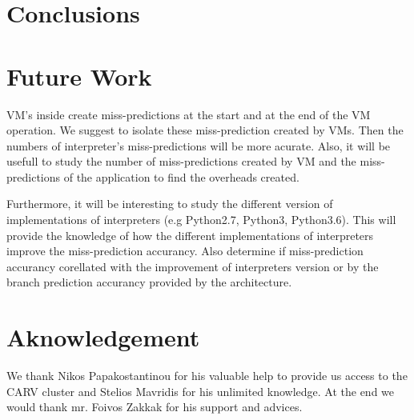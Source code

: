 \documentclass[parskip=full, paper=a4, fontsize=12pt]{scrartcl}
\numberwithin{equation}{section}
\numberwithin{figure}{section}
\numberwithin{table}{section}
\begin{document}
\section{Conclusions}



\section{Future Work}
VM's inside create miss-predictions at the start and at the end of the
VM operation.  We suggest to isolate these miss-prediction created by
VMs. Then the numbers of interpreter's miss-predictions will be more
acurate. Also, it will be usefull to study the number of
miss-predictions created by VM and the miss-predictions of the
application to find the overheads created.

Furthermore, it will be interesting to study the different version of
implementations of interpreters (e.g Python2.7, Python3, Python3.6).
This will provide the knowledge of how the different implementations
of interpreters improve the miss-prediction accurancy. Also determine
if miss-prediction accurancy corellated with the improvement of
interpreters version or by the branch prediction accurancy provided by
the architecture.

\section{Aknowledgement}
We thank Nikos Papakostantinou for his valuable help to provide us
access to the CARV cluster and Stelios Mavridis for his unlimited
knowledge. At the end we would thank mr. Foivos Zakkak for his support
and advices.

\newpage


\end{document}
